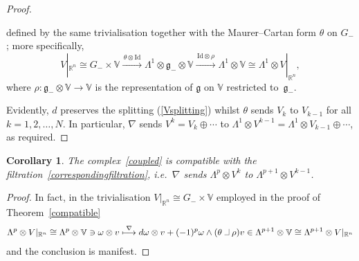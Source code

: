 \documentclass[11pt]{article}
\newtheorem{corollary}{Corollary}
\newcommand{\intprod}{\;\rule{5pt}{.3pt}\rule{.3pt}{7pt}\;}
\begin{document}
\begin{proof}
\begin{itemize}
def\/ined by the same trivialisation together with the Maurer--Cartan form
$\theta$ on $G_-$; more specif\/ically,
\[V|_{{\mathbb{R}}^n}\cong
G_-\times{\mathbb{V}}\xrightarrow{\,\theta\otimes{\mathrm{Id}}\,}
\Lambda^1\otimes{\mathfrak{g}}_-\otimes{\mathbb{V}}
\xrightarrow{\,{\mathrm{Id}}\otimes\rho\,}\Lambda^1\otimes{\mathbb{V}}\cong
\Lambda^1\otimes V|_{{\mathbb{R}}^n},\]
where $\rho:{\mathfrak{g}}_-\otimes{\mathbb{V}}\to{\mathbb{V}}$ is the
representation of ${\mathfrak{g}}$ on ${\mathbb{V}}$ restricted
to~${\mathfrak{g}}_-$.
\end{itemize}
Evidently, $d$ preserves the splitting (\ref{Vsplitting}) whilst $\theta$
sends $V_k$ to $V_{k-1}$ for all $k=1,2,\ldots, N$. In particular, $\nabla$
sends $V^k=V_k\oplus\cdots$ to
$\Lambda^1\otimes V^{k-1}=\Lambda^1\otimes V_{k-1}\oplus\cdots$, as required.
\end{proof}

\begin{corollary}\label{easypeasy}
The complex~\eqref{coupled} is compatible with the
filtration~\eqref{correspondingfiltration}, i.e.~$\nabla$ sends
$\Lambda^p\otimes V^k$ to $\Lambda^{p+1}\otimes V^{k-1}$.
\end{corollary}

\begin{proof} In fact, in the trivialisation $V|_{{\mathbb{R}}^n}\cong
G_-\times{\mathbb{V}}$ employed in the proof of Theorem~\ref{compatible}
\begin{gather*}
\Lambda^p\otimes V|_{{\mathbb{R}}^n}\cong\Lambda^p\otimes{\mathbb{V}}\ni
\omega\otimes v\stackrel{\nabla}{\longmapsto}
d\omega\otimes v+(-1)^p\omega\wedge(\theta\intprod\rho)v\in
\Lambda^{p+1}\otimes{\mathbb{V}}\cong\Lambda^{p+1}\otimes V|_{{\mathbb{R}}^n}
\end{gather*}
and the conclusion is manifest.\end{proof}
\end{document}
